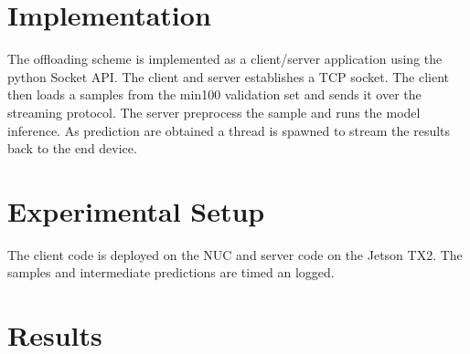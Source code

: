 %	





\section{Implementation}

The offloading scheme is implemented as a client/server application using the \gls{python} Socket API. The client and server establishes a TCP socket. The client then loads a samples from the \gls{min100} validation set and sends it over the streaming protocol. The server preprocess the sample and runs the model inference. As prediction are obtained a thread is spawned to stream the results back to the end device. 

\section{Experimental Setup}

The client code is deployed on the NUC and server code on the Jetson TX2. The samples and intermediate predictions are timed an logged. 

\section{Results}

